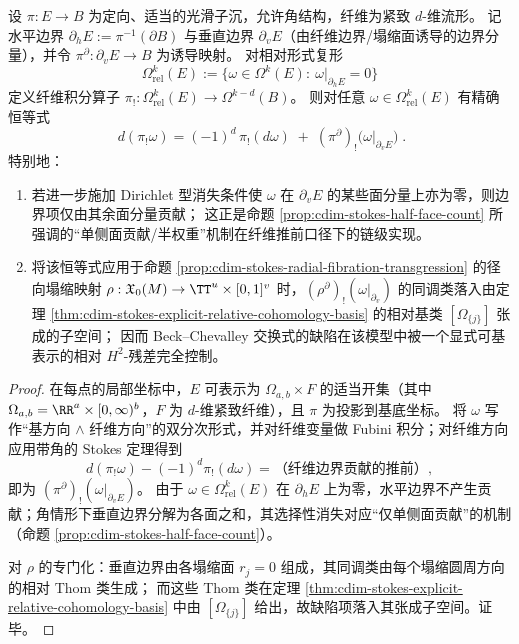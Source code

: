 \begin{proposition}\label{prop:cdim-stokes-fiber-integration-defect}
设 \(\pi:E\to B\) 为定向、适当的光滑子沉，允许角结构，纤维为紧致 \(d\)-维流形。
记水平边界 \(\partial_hE:=\pi^{-1}(\partial B)\) 与垂直边界 \(\partial_vE\)（由纤维边界/塌缩面诱导的边界分量），并令 \(\pi^{\partial}:\partial_vE\to B\) 为诱导映射。
对相对形式复形
\[
\Omega_{\mathrm{rel}}^{k}(E):=\{\omega\in\Omega^{k}(E):\ \omega|_{\partial_hE}=0\}
\]
定义纤维积分算子 \(\pi_!:\Omega_{\mathrm{rel}}^{k}(E)\to \Omega^{k-d}(B)\)。
则对任意 \(\omega\in\Omega_{\mathrm{rel}}^{k}(E)\) 有精确恒等式
\[
\boxed{\;
d(\pi_!\omega)=(-1)^d\,\pi_!(d\omega)\;+\;(\pi^{\partial})_!\bigl(\omega|_{\partial_vE}\bigr)\; } .
\]
特别地：
\begin{enumerate}
  \item 若进一步施加 Dirichlet 型消失条件使 \(\omega\) 在 \(\partial_vE\) 的某些面分量上亦为零，则边界项仅由其余面分量贡献；
  这正是命题 \ref{prop:cdim-stokes-half-face-count} 所强调的“单侧面贡献/半权重”机制在纤维推前口径下的链级实现。
  \item 将该恒等式应用于命题 \ref{prop:cdim-stokes-radial-fibration-transgression} 的径向塌缩映射
  \(
  \rho:\mathfrak X_0(M)\to \TT^u\times[0,1]^v
  \)
  时，\((\rho^{\partial})_!(\omega|_{\partial_v})\) 的同调类落入由定理 \ref{thm:cdim-stokes-explicit-relative-cohomology-basis} 的相对基类 \([\Omega_{\{j\}}]\) 张成的子空间；
  因而 Beck--Chevalley 交换式的缺陷在该模型中被一个显式可基表示的相对 \(H^2\)-残差完全控制。
\end{enumerate}
\end{proposition}
\begin{proof}
在每点的局部坐标中，\(E\) 可表示为 \(\Omega_{a,b}\times F\) 的适当开集（其中 \(\Omega_{a,b}=\RR^{a}\times[0,\infty)^{b}\)，\(F\) 为 \(d\)-维紧致纤维），且 \(\pi\) 为投影到基底坐标。
将 \(\omega\) 写作“基方向 \(\wedge\) 纤维方向”的双分次形式，并对纤维变量做 Fubini 积分；对纤维方向应用带角的 Stokes 定理得到
\[
d(\pi_!\omega)-(-1)^d\pi_!(d\omega)=\text{（纤维边界贡献的推前）},
\]
即为 \((\pi^{\partial})_!(\omega|_{\partial_vE})\)。
由于 \(\omega\in\Omega_{\mathrm{rel}}^{k}(E)\) 在 \(\partial_hE\) 上为零，水平边界不产生贡献；角情形下垂直边界分解为各面之和，其选择性消失对应“仅单侧面贡献”的机制（命题 \ref{prop:cdim-stokes-half-face-count}）。
\par
对 \(\rho\) 的专门化：垂直边界由各塌缩面 \(r_j=0\) 组成，其同调类由每个塌缩圆周方向的相对 Thom 类生成；
而这些 Thom 类在定理 \ref{thm:cdim-stokes-explicit-relative-cohomology-basis} 中由 \([\Omega_{\{j\}}]\) 给出，故缺陷项落入其张成子空间。证毕。
\end{proof}

